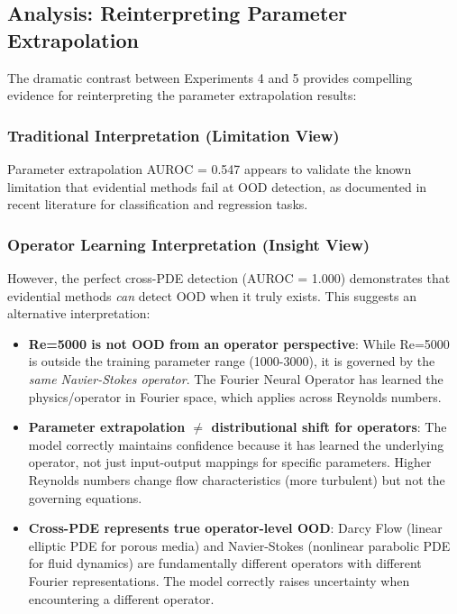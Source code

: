 \subsection{Analysis: Reinterpreting Parameter Extrapolation}

The dramatic contrast between Experiments 4 and 5 provides compelling evidence for reinterpreting the parameter extrapolation results:

\subsubsection{Traditional Interpretation (Limitation View)}

Parameter extrapolation AUROC = 0.547 appears to validate the known limitation that evidential methods fail at OOD detection, as documented in recent literature for classification and regression tasks.

\subsubsection{Operator Learning Interpretation (Insight View)}

However, the perfect cross-PDE detection (AUROC = 1.000) demonstrates that evidential methods \textit{can} detect OOD when it truly exists. This suggests an alternative interpretation:

\begin{itemize}
\item \textbf{Re=5000 is not OOD from an operator perspective}: While Re=5000 is outside the training parameter range (1000-3000), it is governed by the \textit{same Navier-Stokes operator}. The Fourier Neural Operator has learned the physics/operator in Fourier space, which applies across Reynolds numbers.

\item \textbf{Parameter extrapolation $\neq$ distributional shift for operators}: The model correctly maintains confidence because it has learned the underlying operator, not just input-output mappings for specific parameters. Higher Reynolds numbers change flow characteristics (more turbulent) but not the governing equations.

\item \textbf{Cross-PDE represents true operator-level OOD}: Darcy Flow (linear elliptic PDE for porous media) and Navier-Stokes (nonlinear parabolic PDE for fluid dynamics) are fundamentally different operators with different Fourier representations. The model correctly raises uncertainty when encountering a different operator.
\end{itemize}

